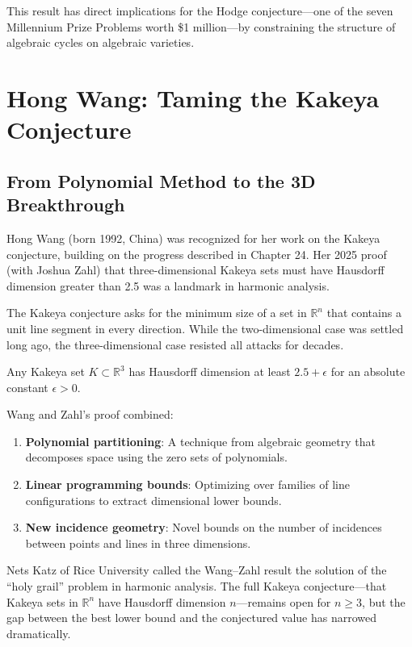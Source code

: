 This result has direct implications for the Hodge conjecture---one of the seven Millennium Prize Problems worth \$1 million---by constraining the structure of algebraic cycles on algebraic varieties.

\section{Hong Wang: Taming the Kakeya Conjecture}

\subsection{From Polynomial Method to the 3D Breakthrough}
Hong Wang (born 1992, China) was recognized for her work on the Kakeya conjecture, building on the progress described in Chapter 24. Her 2025 proof (with Joshua Zahl) that three-dimensional Kakeya sets must have Hausdorff dimension greater than 2.5 was a landmark in harmonic analysis.

The Kakeya conjecture asks for the minimum size of a set in $\mathbb{R}^n$ that contains a unit line segment in every direction. While the two-dimensional case was settled long ago, the three-dimensional case resisted all attacks for decades.

\begin{theorem}
Any Kakeya set $K \subset \mathbb{R}^3$ has Hausdorff dimension at least $2.5 + \epsilon$ for an absolute constant $\epsilon > 0$.
\end{theorem}

Wang and Zahl's proof combined:
\begin{enumerate}
\item \textbf{Polynomial partitioning}: A technique from algebraic geometry that decomposes space using the zero sets of polynomials.
\item \textbf{Linear programming bounds}: Optimizing over families of line configurations to extract dimensional lower bounds.
\item \textbf{New incidence geometry}: Novel bounds on the number of incidences between points and lines in three dimensions.
\end{enumerate}

\begin{highlightbox}
Nets Katz of Rice University called the Wang--Zahl result the solution of the ``holy grail'' problem in harmonic analysis. The full Kakeya conjecture---that Kakeya sets in $\mathbb{R}^n$ have Hausdorff dimension $n$---remains open for $n \geq 3$, but the gap between the best lower bound and the conjectured value has narrowed dramatically.
\end{highlightbox}

